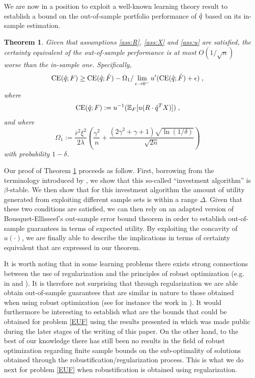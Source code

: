 \documentclass[]{interact}
\theoremstyle{plain}%
\theoremstyle{definition}
\theoremstyle{remark}
\def\Expect{{\mathbb E}}
\newcommand{\0}{\V{0}}
\newcommand{\1}{\V{1}}
\newcommand{\quoteIt}[1]{``#1''}
\newcommand{\modified}[1]{{\color{blue} #1}}
\def\CE{\mathop{\rm CE}}
\theoremstyle{plain}
\newtheorem{thm}{Theorem}
\theoremstyle{definition}
\begin{document}
We are now in a position to exploit a well-known learning theory result to establish a
bound on the out-of-sample portfolio performance of ${\hat{q}}$ based on its in-sample
estimation.
\begin{thm}\label{thm:outsampleBound1}
  Given that assumptions \ref{ass:R}, \ref{ass:X} and \ref{ass:u} are satisfied, the
  certainty equivalent of the out-of-sample performance is at most $O(1/\sqrt{n})$ worse
  than the in-sample one. Specifically,
  \[ 
    \CE(\qhat;\F) \geq \CE(\qhat;\Fhat) -
    \Omega_1/\lim_{\epsilon\to0^-}u'(\CE(\qhat;\Fhat)+\epsilon)\;,
  \]
  where
  \begin{gather*}
    \CE(\qhat;\F):=u^{-1}(\Expect_\F[u(R\cdot\qhat^T X)])\;,\\
  \end{gather*}
and where
  \[
    \Omega_1 := \frac{\bar{r}^2 \xi^2}{2\lambda} \left(\frac{\gamma^2}{n} +
      \frac{(2\gamma^2+\gamma+1)\sqrt{\ln(1/\delta)}}{\sqrt{2n}}\right)
  \] 
  with probability $1-\delta$.
\end{thm}

Our proof of Theorem \ref{thm:outsampleBound1} proceeds as follow. First, borrowing from
the terminology introduced by \cite{bousquet2002stability}, we show that this so-called \quoteIt{investment algorithm} is $\beta$-stable. We then show that for this investment algorithm the amount of utility generated from exploiting different sample sets is within a range $\Delta$. Given that these two conditions are satisfied, we can then rely on an adapted version of Bousquet-Ellisseef's out-sample error bound theorem in order to establish out-of-sample guarantees in terms of expected utility. By
exploiting the concavity of $u(\cdot)$, we are finally able to describe the implications
in terms of certainty equivalent that are expressed in our theorem.

\modified{It is worth noting that in some learning problems there exists strong connections between the use of regularization and the principles of robust optimization (e.g. in \cite{caramanis2012} and \cite{Duchi2017}). It is therefore not surprising that through regularization we are able obtain out-of-sample guarantees that are similar in nature to those obtained when using robust optimization (see for instance the work in \cite{Esfahani15}). It would furthermore be interesting to establish what are the bounds that could be obtained for problem \eqref{EUF} using the results presented in \cite{soroosh2017} which was made public during the later stages of the writing of this paper. On the other hand, to the best of our knowledge there has still been no results in the field of robust optimization regarding finite sample bounds on the sub-optimality of solutions obtained through the robustification/regularization process. This is what we do next for problem \eqref{EUF} when robustification is obtained using regularization.}
\end{document}

